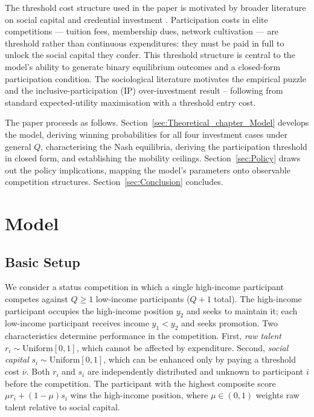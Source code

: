 \documentclass[
    oneside,
    fontsize=10pt,leqno]{article}
\begin{document}
The threshold cost structure used in the paper is motivated by broader literature on social capital and credential investment \citep{Jencks1979, HeckmanMosso2014}. Participation costs in elite competitions --- tuition fees, membership dues, network cultivation
--- are threshold rather than continuous expenditures: they must be
paid in full to unlock the social capital they confer. This
threshold structure is central to the model's ability to generate
binary equilibrium outcomes and a closed-form participation
condition. The sociological literature \citep{wegener1992prestigeconcepts,
MijsParadox2021, MijsMeritocracy2020} motivates the empirical
puzzle and the inclusive-participation (IP) over-investment result -- following from
standard expected-utility maximisation with a threshold entry cost.

The paper proceeds as follows.
Section~\ref{sec:Theoretical_chapter_Model} develops the model,
deriving winning probabilities for all four investment cases under
general $Q$, characterising the Nash equilibria, deriving the
participation threshold in closed form, and establishing the
mobility ceilings. Section~\ref{sec:Policy} draws out the policy
implications, mapping the model's parameters onto observable
competition structures. Section~\ref{sec:Conclusion} concludes.

\section{\label{sec:Theoretical_chapter_Model}Model}

\subsection{Basic Setup}

\noindent

We consider a status competition in which a single high-income participant competes against $Q\geq1$ low-income participants ($Q+1$ total).
The high-income participant occupies the high-income position $y_{2}$ and
seeks to maintain it; each low-income participant receives income $y_{1}<y_{2}$
and seeks promotion. Two characteristics determine performance in
the competition. First, \emph{raw talent} $r_{i}\sim\mathrm{Uniform}[0,1]$,
which cannot be affected by expenditure. Second, \emph{social capital}
$s_{i}\sim\mathrm{Uniform}[0,1]$, which can be enhanced only by paying
a threshold cost $\overline{\nu}$. Both $r_{i}$ and $s_{i}$ are
independently distributed and unknown to participant $i$ before the
competition. The participant with the highest composite score $\mu
r_{i}+(1-\mu)s_{i}$ wins the high-income position, where $\mu\in(0,1)$
weights raw talent relative to social capital.
\end{document}
